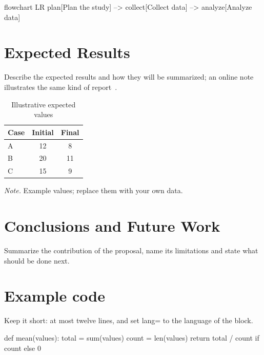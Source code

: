 \documentclass[a4paper,12pt]{report}
\numberwithin{equation}{chapter}
\begin{document}
  \begin{mermaid}[style=monochrome, caption={General flow of the methodology}, pos=H]
    flowchart LR
    plan[Plan the study] --> collect[Collect data] --> analyze[Analyze data]
  \end{mermaid}

  \chapter{Expected Results}\label{chap:results}
  Describe the expected results and how they will be summarized; an online
  note illustrates the same kind of report~\cite{example3}.

  \begin{table}[H]
    \caption{Illustrative expected values}
    \label{tab:expected}
    \begin{tabular}{@{}lcc@{}}
      \toprule
      Case & Initial & Final \\
      \midrule
      A & 12 & 8 \\
      B & 20 & 11 \\
      C & 15 & 9 \\
      \bottomrule
    \end{tabular}
    \par\medskip
    \begin{minipage}{\linewidth}
      \footnotesize\textit{Note.} Example values; replace them with your own data.
    \end{minipage}
  \end{table}

  \chapter{Conclusions and Future Work}\label{chap:conclusions}
  Summarize the contribution of the proposal, name its limitations and state
  what should be done next.

  
  

  \appendix
  \chapter{Example code}
  Keep it short: at most twelve lines, and set lang= to the language of the
  block.

  \begin{code}[lang=python, numbers=true]
def mean(values):
    total = sum(values)
    count = len(values)
    return total / count if count else 0
  \end{code}
\end{document}
